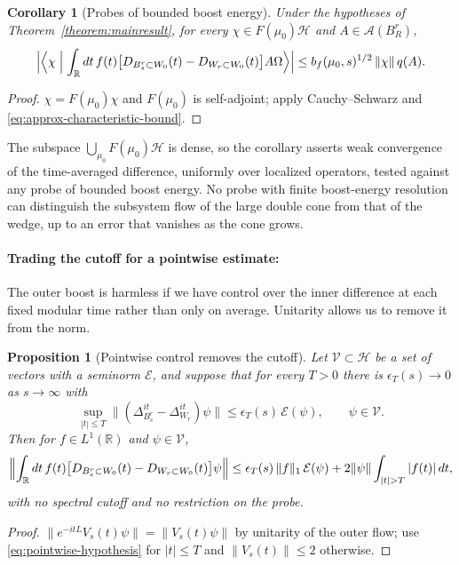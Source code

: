 \documentclass[a4paper,11pt]{article}
\newtheorem{corollary}[theorem]{Corollary}
\newtheorem{proposition}[theorem]{Proposition}
\theoremstyle{definition}
\begin{document}
\begin{corollary}[Probes of bounded boost energy]\label{cor:probes}
Under the hypotheses of Theorem~\ref{theorem:mainresult}, for every $\chi\in F(\mu_0)\mathcal H$ and $A\in\mathcal A(B_R^r)$,
\begin{equation}
 \Bigl|\Bigl\langle\chi\Bigm|\int_{\mathbb R}dt\,f(t)\bigl[D_{B_s^r\subset W_0}(t)-D_{W_r\subset W_0}(t)\bigr]A\Omega\Bigr\rangle\Bigr|
 \le b_f(\mu_0,s)^{1/2}\,\|\chi\|\,q(A).
\end{equation}
\end{corollary}
\begin{proof}
$\chi=F(\mu_0)\chi$ and $F(\mu_0)$ is self-adjoint; apply Cauchy--Schwarz and \eqref{eq:approx-characteristic-bound}.
\end{proof}
The subspace $\bigcup_{\mu_0}F(\mu_0)\mathcal H$ is dense, so the corollary asserts weak convergence of the time-averaged difference, uniformly over localized operators, tested against any probe of bounded boost energy. No probe with finite boost-energy resolution can distinguish the subsystem flow of the large double cone from that of the wedge, up to an error that vanishes as the cone grows.

\paragraph{Trading the cutoff for a pointwise estimate:}
The outer boost is harmless if we have control over the inner difference at each fixed modular time rather than only on average. Unitarity allows us to remove it from the norm.

\begin{proposition}[Pointwise control removes the cutoff]\label{prop:pointwise}
Let $\mathcal V\subset\mathcal H$ be a set of vectors with a seminorm $\mathcal E$, and suppose that for every $T>0$ there is $\epsilon_T(s)\to0$ as $s\to\infty$ with
\begin{equation}
 \sup_{|t|\le T}\bigl\|(\Delta_{B_s^r}^{it}-\Delta_{W_r}^{it})\psi\bigr\|\le\epsilon_T(s)\,\mathcal E(\psi),\qquad\psi\in\mathcal V .
 \label{eq:pointwise-hypothesis}
\end{equation}
Then for $f\in L^1(\mathbb R)$ and $\psi\in\mathcal V$,
\begin{equation}
 \Bigl\|\int_{\mathbb R}dt\,f(t)\bigl[D_{B_s^r\subset W_0}(t)-D_{W_r\subset W_0}(t)\bigr]\psi\Bigr\|
 \le\epsilon_T(s)\,\|f\|_1\,\mathcal E(\psi)+2\|\psi\|\int_{|t|>T}|f(t)|\,dt ,
 \label{eq:pointwise-conclusion}
\end{equation}
with no spectral cutoff and no restriction on the probe.
\end{proposition}
\begin{proof}
$\|e^{-itL}V_s(t)\psi\|=\|V_s(t)\psi\|$ by unitarity of the outer flow; use \eqref{eq:pointwise-hypothesis} for $|t|\le T$ and $\|V_s(t)\|\le2$ otherwise.
\end{proof}
\end{document}
